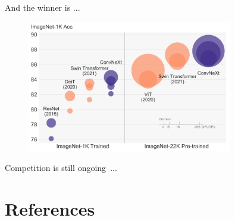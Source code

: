 \documentclass[xcolor=pdftex,dvipsnames,table,mathserif]{beamer}
\begin{document}
\begin{frame}{And the winner is ...}

\pause

\begin{figure}[ht]
  \centering
  \includegraphics[width=0.8\textwidth]{convnext_vs_transformer}
\end{figure}

Competition is still ongoing~\cite{liu_convnet_2022}...


\end{frame}








\section*{References}

\end{document}
